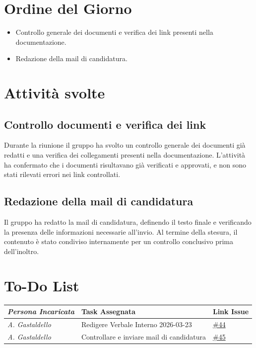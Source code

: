 \documentclass[a4paper,12pt]{article}
\begin{document}
\section{Ordine del Giorno}
    \begin{itemize}
    \item Controllo generale dei documenti e verifica dei link presenti nella documentazione.
    \item Redazione della mail di candidatura.
    \end{itemize}

\section{Attività svolte}
\subsection{Controllo documenti e verifica dei link}
Durante la riunione il gruppo ha svolto un controllo generale dei documenti già redatti e una verifica dei collegamenti presenti nella documentazione. L'attività ha confermato che i documenti risultavano già verificati e approvati, e non sono stati rilevati errori nei link controllati.

\subsection{Redazione della mail di candidatura}
Il gruppo ha redatto la mail di candidatura, definendo il testo finale e verificando la presenza delle informazioni necessarie all'invio. Al termine della stesura, il contenuto è stato condiviso internamente per un controllo conclusivo prima dell'inoltro.

\section{To-Do List}
\begin{table}[H]
    \centering
    \begin{tabular}{|p{4.2cm}|p{5cm}|l|}
    \hline
        \rowcolor{lightgray}\textit{\textbf{Persona Incaricata}}  & \textbf{Task Assegnata} &\textbf{Link Issue} \\
    \hline
        
        \textit{A. Gastaldello} & Redigere Verbale Interno 2026-03-23 & \href{https://github.com/aLittleByte-19/Documentazione/issues/44}{\#44}\\
    \hline
        \textit{A. Gastaldello} & Controllare e inviare mail di candidatura & \href{https://github.com/aLittleByte-19/Documentazione/issues/45}{\#45}\\
    \hline
        
    \end{tabular}
    \label{tab:todo}
\end{table}
\end{document}
